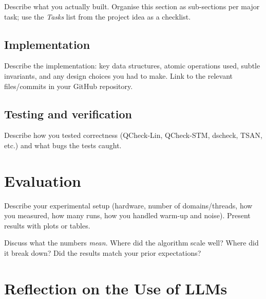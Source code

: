 \documentclass[11pt,a4paper]{article}
\begin{document}
Describe what you actually built. Organise this section as sub-sections per
major task; use the \emph{Tasks} list from the project idea as a checklist.

\subsection{Implementation}
Describe the implementation: key data structures, atomic operations used,
subtle invariants, and any design choices you had to make. Link to the
relevant files/commits in your GitHub repository.

\subsection{Testing and verification}
Describe how you tested correctness (QCheck-Lin, QCheck-STM, dscheck, TSAN,
etc.) and what bugs the tests caught.

\section{Evaluation}
\label{sec:evaluation}

Describe your experimental setup (hardware, number of domains/threads, how
you measured, how many runs, how you handled warm-up and noise). Present
results with plots or tables.


Discuss what the numbers \emph{mean}. Where did the algorithm scale well?
Where did it break down? Did the results match your prior expectations?

\section{Reflection on the Use of LLMs}
\label{sec:llm}

\end{document}
